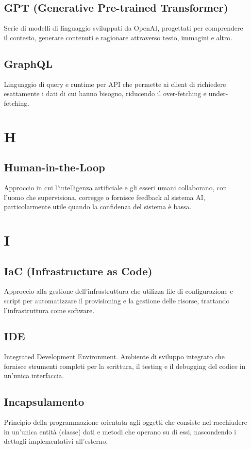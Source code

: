 \documentclass[a4paper,11pt]{article}
\begin{document}
\subsection{GPT (Generative Pre-trained Transformer)}
Serie di modelli di linguaggio sviluppati da OpenAI, progettati per comprendere il contesto, generare contenuti e ragionare attraverso testo, immagini e altro.

\subsection{GraphQL}
Linguaggio di query e runtime per API che permette ai client di richiedere esattamente i dati di cui hanno bisogno, riducendo il over-fetching e under-fetching.

\newpage
\section{H}

\subsection{Human-in-the-Loop}
Approccio in cui l'intelligenza artificiale e gli esseri umani collaborano, con l'uomo che supervisiona, corregge o fornisce feedback al sistema AI, particolarmente utile quando la confidenza del sistema è bassa.

\newpage
\section{I}

\subsection{IaC (Infrastructure as Code)}
Approccio alla gestione dell'infrastruttura che utilizza file di configurazione e script per automatizzare il provisioning e la gestione delle risorse, trattando l'infrastruttura come software.

\subsection{IDE}
Integrated Development Environment. Ambiente di sviluppo integrato che fornisce strumenti completi per la scrittura, il testing e il debugging del codice in un'unica interfaccia.

\subsection{Incapsulamento}
Principio della programmazione orientata agli oggetti che consiste nel racchiudere in un'unica entità (classe) dati e metodi che operano su di essi, nascondendo i dettagli implementativi all'esterno.
\end{document}
